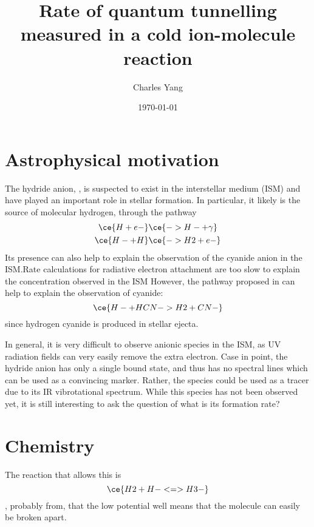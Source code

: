 \documentclass{article}
\title{Rate of quantum tunnelling measured in a cold ion-molecule reaction}
\author{Charles Yang}
\date{\today}
\begin{document}
\maketitle
\section{Astrophysical motivation}
The hydride anion, , is suspected to exist in the interstellar medium (ISM) and have played an important role in stellar formation. In particular, it likely is the source of molecular hydrogen, through the pathway\cite{peebles_origin_1968}
\begin{subequations}
    \begin{align}
        \ce{H + e-}&\ce{-> H- + \gamma}\\
        \ce{H- + H}&\ce{-> H2 + e-}
    \end{align}
\end{subequations}
Its presence can also help to explain the observation of the cyanide anion  in the ISM.\@ Rate calculations for radiative electron attachment are too slow to explain the concentration observed in the ISM\cite{douguet_theory_2013}
However, the pathway proposed in can help to explain the observation of cyanide:
\begin{equation}
    \ce{H- + HCN -> H2 + CN-}
\end{equation}
since hydrogen cyanide is produced in stellar ejecta\cite{tielens_molecular_2013}.

In general, it is very difficult to observe anionic species in the ISM, as UV radiation fields can very easily remove the extra electron. Case in point, the hydride anion has only a single bound state, and thus has no spectral lines which can be used as a convincing marker. Rather, the species  could be used as a tracer\cite{ayouz_formation_2011} due to its IR vibrotational spectrum. While this species has not been observed yet, it is still interesting to ask the question of what is its formation rate?

\section{Chemistry}
The reaction that allows this is 
\begin{equation}
    \ce{H2 + H- <=> H3-} \label{eq:h3}
\end{equation}
, probably from\cite{wang_observations_2003}, that the low potential well means that the molecule can easily be broken apart.
\end{document}
